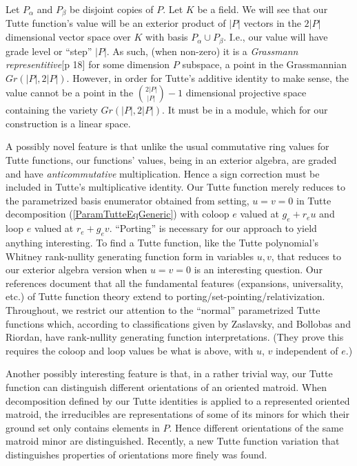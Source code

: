 \documentclass[Unicode]{cedram-alco}
\begin{document}
Let $P_{\alpha}$ and $P_{\beta}$ be disjoint copies of $P$.  Let $K$ be a field.
We will see that our Tutte function's value will be an exterior product of
$|P|$ vectors in the $2|P|$ dimensional vector space over $K$ with basis $P_\alpha \cup P_\beta$.
I.e., our value will
have grade level or ``step''  $|P|$.
As such, (when non-zero)
it is a \emph{Grassmann representitive}\cite{MarcusFDMuAlPt2}[p 18]
for some
dimension $P$ subspace, a point in the Grassmannian $Gr(|P|,2|P|)$.
However, in order for Tutte's additive identity to make sense, the value cannot be
a point in the $\binom{2|P|}{|P|}-1$ dimensional projective space
containing the variety $Gr(|P|,2|P|)$.  It must be in a module, which for
our construction is a linear space.

A possibly novel feature is that unlike the usual commutative ring values for Tutte
functions, our functions' values, being in an exterior algebra, are graded and have
\emph{anticommutative} multiplication.
Hence a sign correction must be included in Tutte's multiplicative
identity.  Our Tutte function merely reduces to the parametrized
basis enumerator obtained from setting, $u=v=0$ in Tutte
decomposition (\ref{ParamTutteEqGeneric})
with coloop $e$ valued at $g_e+r_eu$ and loop $e$ valued at $r_e+g_ev$.
``Porting'' is necessary for our approach to yield anything
interesting. To find a Tutte function,
like the Tutte polynomial's Whitney rank-nullity
generating function form in variables $u,v$, that reduces to our exterior
algebra version when $u=v=0$ is an interesting question.
Our
references\cite{MR0419272,SetPointedLV,sdcPorted,TutteEx,RelTuttePolyDiaoHetyei}
document that all the fundamental features
(expansions, universality, etc.)
of Tutte function theory extend to porting/set-pointing/relativization.  Throughout,
we restrict our attention to the ``normal'' parametrized Tutte functions which, according
to classifications given by Zaslavsky\cite{MR93a:05047},
and Bollobas and Riordan\cite{BollobasRiordanTuttePolyColored},
have rank-nullity generating function interpretations.
(They prove this requires the
coloop and loop values be what is above, with $u$, $v$ independent of $e$.)

Another possibly interesting feature is that, in a rather trivial way,
our Tutte function can distinguish different orientations of an oriented
matroid.  When decomposition defined by our Tutte identities is applied to
a represented oriented matroid, the irreducibles are representations of
some of its minors for which their ground set only contains elements in $P$.
Hence different orientations of the same matroid minor are distinguished.  Recently,
a new Tutte function variation that distinguishes properties of orientations
more finely was found\cite{AwanBernardiOMTuttePre}.
\end{document}
